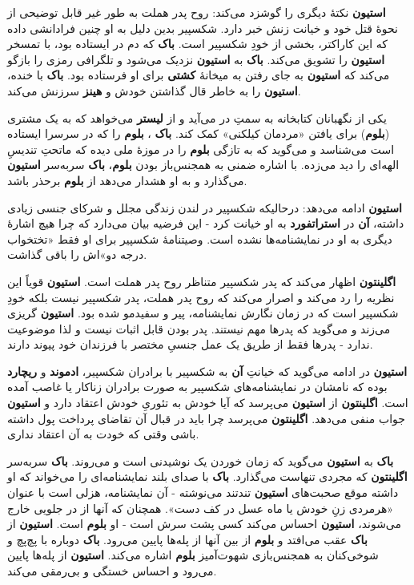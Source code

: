 \documentclass[12pt]{book}
\newcommand{\noun}[1]{{\textbf{#1}}}
\begin{document}
    \noun{استیون} نکتهٔ دیگری را گوشزد می‌کند: روح پدر هملت به طور غیر قابل توضیحی از نحوهٔ قتل خود و خیانت زنش خبر دارد. شکسپیر بدین دلیل به او چنین فرادانشی داده که این کاراکتر، بخشی از خودِ شکسپیر است. \noun{باک}  که دم در ایستاده بود، با تمسخر \noun{استیون} را تشویق می‌کند. \noun{باک}  به \noun{استیون} نزدیک می‌شود و تلگرافی رمزی را بازگو می‌کند که \noun{استیون} به جای رفتن به میخانهٔ \noun{کشتی} برای او فرستاده بود. \noun{باک}  با خنده، \noun{استیون} را به خاطر قال گذاشتن خودش و \noun{هینز}  سرزنش می‌کند.

    یکی از نگهبانان کتابخانه به سمتِ در می‌آید و از \noun{لیستر} می‌خواهد که به یک مشتری (\noun{بلوم}) برای یافتن «مردمان کیلکنی» کمک کند. \noun{باک} ، \noun{بلوم} را که در سرسرا ایستاده است می‌شناسد و می‌گوید که به تازگی \noun{بلوم} را در موزهٔ ملی دیده که ماتحتِ تندیسِ الهه‌ای را دید می‌زده. با اشاره ضمنی به همجنس‌باز بودن \noun{بلوم}، \noun{باک}  سربه‌سر \noun{استیون} می‌گذارد و به او هشدار می‌دهد از \noun{بلوم} برحذر باشد.

    \noun{استیون} ادامه می‌دهد: درحالیکه شکسپیر در لندن زندگی مجلل و شرکای جنسی زیادی داشته، \noun{آن} در \noun{استراتفورد} به او خیانت کرد - این فرضیه بیان می‌دارد که چرا هیچ اشارهٔ دیگری به او در نمایشنامه‌ها نشده است. وصیتنامهٔ شکسپیر برای او فقط «تختخواب درجه دو»اش را باقی گذاشت.

    \noun{اگلینتون} اظهار می‌کند که پدر شکسپیر متناظر روح پدر هملت است. \noun{استیون} قویاً این نظریه را رد می‌کند و اصرار می‌کند که روح پدر هملت، پدر شکسپیر نیست بلکه خودِ شکسپیر است که در زمان نگارش نمایشنامه، پیر و سفیدمو شده بود. \noun{استیون} گریزی می‌زند و می‌گوید که پدرها مهم نیستند. پدر بودن قابل اثبات نیست و لذا موضوعیت ندارد - پدرها فقط از طریق یک عمل جنسیِ مختصر با فرزندان خود پیوند دارند.

    \noun{استیون} در ادامه می‌گوید که خیانتِ \noun{آن} به شکسپیر با برادران شکسپیر، \noun{ادموند} و \noun{ریچارد} بوده که نامشان در نمایشنامه‌های شکسپیر به صورت برادران زناکار یا غاصب آمده است. \noun{اگلینتون} از \noun{استیون} می‌پرسد که آیا خودش به تئوریِ خودش اعتقاد دارد و \noun{استیون} جواب منفی می‌دهد. \noun{اگلینتون} می‌پرسد چرا باید در قبال آن تقاضای پرداخت پول داشته باشی وقتی که خودت به آن اعتقاد نداری.

    \noun{باک}  به \noun{استیون} می‌گوید که زمان خوردن یک نوشیدنی است و می‌روند. \noun{باک}  سربه‌سر \noun{اگلینتون} که مجردی تنهاست می‌گذارد. \noun{باک}  با صدای بلند نمایشنامه‌ای را می‌خواند که او داشته موقع صحبت‌های \noun{استیون} تندتند می‌نوشته - آن نمایشنامه، هزلی است با عنوان «هرمردی زنِ خودش یا ماه عسل در کف دست». همچنان که آنها از در جلویی خارج می‌شوند، \noun{استیون} احساس می‌کند کسی پشت سرش است - او \noun{بلوم} است. \noun{استیون} از \noun{باک}  عقب می‌افتد و \noun{بلوم} از بین آنها از پله‌ها پایین می‌رود. \noun{باک}  دوباره با پچ‌پچ و شوخی‌کنان به همجنس‌بازی شهوت‌آمیز \noun{بلوم} اشاره می‌کند. \noun{استیون} از پله‌ها پایین می‌رود و احساس خستگی و بی‌رمقی می‌کند.
\end{document}
